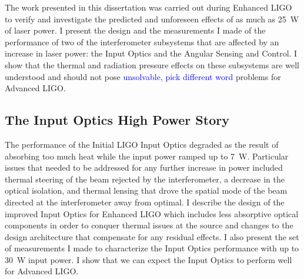 The work presented in this dissertation was carried out during
Enhanced LIGO to verify and investigate the predicted and unforeseen
effects of as much as 25~W of laser power. I present the design and
the measurements I made of the performance of two of the
interferometer subsystems that are affected by an increase in laser
power: the Input Optics and the Angular Sensing and Control. I show
that the thermal and radiation pressure effects on these subsystems
are well understood and should not pose \textcolor{blue}{unsolvable,
  pick different word} problems for
Advanced LIGO.


\subsection{The Input Optics High Power Story} 
The performance of the Initial LIGO Input Optics degraded as the
result of absorbing too much heat while the input power ramped up to
7~W. Particular issues that needed to be addressed for any further
increase in power included thermal steering of the beam rejected by
the interferometer, a decrease in the optical isolation, and thermal
lensing that drove the spatial mode of the beam directed at the
interferometer away from optimal. I describe the design of the
improved Input Optics for Enhanced LIGO which includes less absorptive
optical components in order to conquer thermal issues at the source
and changes to the design architecture that compensate for any
residual effects. I also present the set of measurements I made to
characterize the Input Optics performance with up to 30~W input
power. I show that we can expect the Input Optics to perform well for
Advanced LIGO.



